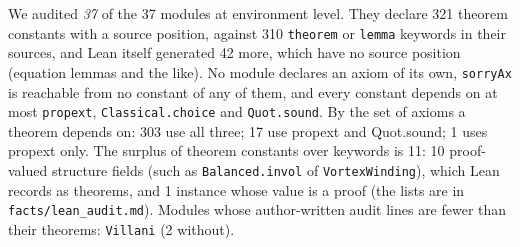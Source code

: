 We audited \emph{37} of the 37 modules at environment level. They declare 321 theorem constants with a source position, against 310 \texttt{theorem} or \texttt{lemma} keywords in their sources, and Lean itself generated 42 more, which have no source position (equation lemmas and the like). No module declares an axiom of its own, \texttt{sorryAx} is reachable from no constant of any of them, and every constant depends on at most \texttt{propext}, \texttt{Classical.choice} and \texttt{Quot.sound}. By the set of axioms a theorem depends on: 303 use all three; 17 use propext and Quot.sound; 1 uses propext only. The surplus of theorem constants over keywords is 11: 10 proof-valued structure fields (such as \texttt{Balanced.invol} of \texttt{VortexWinding}), which Lean records as theorems, and 1 instance whose value is a proof (the lists are in \texttt{facts/lean\_audit.md}). Modules whose author-written audit lines are fewer than their theorems: \texttt{Villani} (2 without). 

